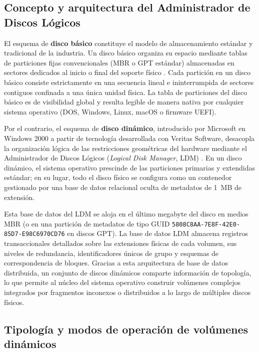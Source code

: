 \documentclass[12pt]{article}
\begin{document}
\subsection{Concepto y arquitectura del Administrador de Discos Lógicos}
\label{subsec:arquitecturaLdm}

El esquema de \textbf{disco básico} constituye el modelo de almacenamiento estándar y tradicional de la industria. Un disco básico organiza su espacio mediante tablas de particiones fijas convencionales (MBR o GPT estándar) almacenadas en sectores dedicados al inicio o final del soporte físico \parencite[\S 12.5.1, p.\ 418]{silberschatz2006fundamentos}. Cada partición en un disco básico consiste estrictamente en una secuencia lineal e ininterrumpida de sectores contiguos confinada a una única unidad física. La tabla de particiones del disco básico es de visibilidad global y resulta legible de manera nativa por cualquier sistema operativo (DOS, Windows, Linux, macOS o firmware UEFI).

Por el contrario, el esquema de \textbf{disco dinámico}, introducido por Microsoft en Windows 2000 a partir de tecnología desarrollada con Veritas Software, desacopla la organización lógica de las restricciones geométricas del hardware mediante el Administrador de Discos Lógicos (\textit{Logical Disk Manager}, LDM) \parencite{microsoft2024basicdynamic}. En un disco dinámico, el sistema operativo prescinde de las particiones primarias y extendidas estándar; en su lugar, todo el disco físico se configura como un contenedor gestionado por una base de datos relacional oculta de metadatos de 1~MB de extensión.

Esta base de datos del LDM se aloja en el último megabyte del disco en medios MBR (o en una partición de metadatos de tipo GUID \texttt{5808C8AA-\allowbreak 7E8F-\allowbreak 42E0-\allowbreak 85D7-\allowbreak E98C6970CD76} en discos GPT). La base de datos LDM almacena registros transaccionales detallados sobre las extensiones físicas de cada volumen, sus niveles de redundancia, identificadores únicos de grupo y esquemas de correspondencia de bloques. Gracias a esta arquitectura de base de datos distribuida, un conjunto de discos dinámicos comparte información de topología, lo que permite al núcleo del sistema operativo construir volúmenes complejos integrados por fragmentos inconexos o distribuidos a lo largo de múltiples discos físicos.

\subsection{Tipología y modos de operación de volúmenes dinámicos}
\label{subsec:tipologiaVolumenesDinamicos}
\end{document}
